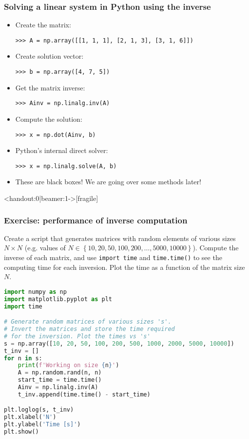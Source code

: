 {\nologo
\begin{frame}[fragile]
  \frametitle{Solving a linear system in Python using the inverse}
  \begin{itemize}
    \item Create the matrix:
    \begin{lstlisting}
>>> A = np.array([[1, 1, 1], [2, 1, 3], [3, 1, 6]])    
    \end{lstlisting}\pause
    \item Create solution vector:
    \begin{lstlisting}
>>> b = np.array([4, 7, 5]) 
    \end{lstlisting}\pause
    \item Get the matrix inverse:
    \begin{lstlisting}
>>> Ainv = np.linalg.inv(A) 
    \end{lstlisting}\pause
    \item Compute the solution:
    \begin{lstlisting}
>>> x = np.dot(Ainv, b)   
    \end{lstlisting}\pause
    \item Python's internal direct solver:
    \begin{lstlisting}
>>> x = np.linalg.solve(A, b)
    \end{lstlisting}
    \item {}These are black boxes! We are going over some methods later!
  \end{itemize}
\end{frame}
}

\begin{frame}<handout:0|beamer:1->[fragile]
  \frametitle{Exercise: performance of inverse computation}
  Create a script that generates matrices with random elements of various sizes $N\times N$ (e.g. values of $N\in\left\{10,20,50,100,200,\ldots,5000,10000\right\}$). Compute the inverse of each matrix, and use \lstinline$import time$ and \lstinline$time.time()$ to see the computing time for each inversion. Plot the time as a function of the matrix size $N$. \pause
    \begin{lstlisting}[language=Python, basicstyle=\tiny]
import numpy as np
import matplotlib.pyplot as plt
import time

# Generate random matrices of various sizes 's'. 
# Invert the matrices and store the time required 
# for the inversion. Plot the times vs 's'
s = np.array([10, 20, 50, 100, 200, 500, 1000, 2000, 5000, 10000])
t_inv = []
for n in s:
    print(f'Working on size {n}')
    A = np.random.rand(n, n)
    start_time = time.time()
    Ainv = np.linalg.inv(A)
    t_inv.append(time.time() - start_time)

plt.loglog(s, t_inv)
plt.xlabel('N')
plt.ylabel('Time [s]')
plt.show()
    \end{lstlisting}
\end{frame}


